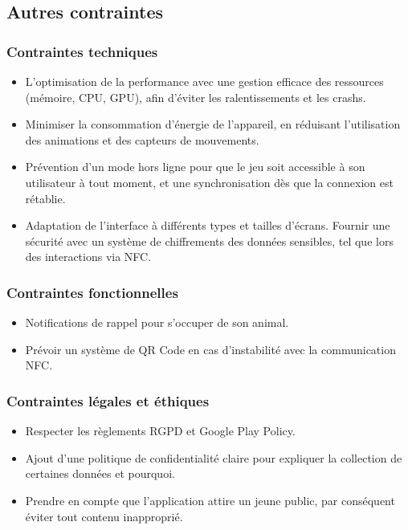 \documentclass{cahier_des_charges}
\begin{document}
\subsection{Autres contraintes}
\subsubsection{Contraintes techniques}
\begin{itemize}[label=\textbullet]
\item L’optimisation de la performance avec une gestion efficace des ressources (mémoire, CPU, GPU), afin d’éviter les ralentissements et les crashs.
\item Minimiser la consommation d'énergie de l’appareil, en réduisant l’utilisation des animations et des capteurs de mouvements.
\item Prévention d’un mode hors ligne pour que le jeu soit accessible à son utilisateur à tout moment, et une synchronisation dès que la connexion est rétablie.
\item Adaptation de l’interface à différents types et tailles d’écrans.
Fournir une sécurité avec un système de chiffrements des données sensibles, tel que lors des interactions via NFC.
\end{itemize}
\subsubsection{Contraintes fonctionnelles}
\begin{itemize}[label=\textbullet]
\item Notifications de rappel pour s’occuper de son animal.
\item Prévoir un système de QR Code en cas d’instabilité avec la communication NFC.
\end{itemize}
\subsubsection{Contraintes légales et éthiques}
\begin{itemize}[label=\textbullet]
\item Respecter les règlements RGPD et Google Play Policy.
\item Ajout d’une politique de confidentialité claire pour expliquer la collection de certaines données et pourquoi.
\item Prendre en compte que l’application attire un jeune public, par conséquent éviter tout contenu inapproprié.
\end{itemize}
\end{document}
